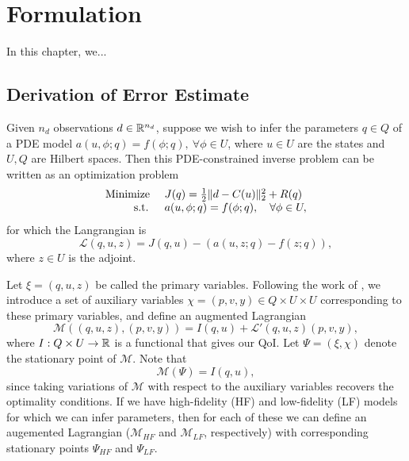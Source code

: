 \chapter{Formulation}

In this chapter, we...
\section{Derivation of Error Estimate}  \label{sec:deriv}
Given $n_d$ observations $d\in{\mathbb{R}}^{n_d}$, suppose we wish to infer the parameters $q\in Q$ of a PDE model $a(u,\phi;q)=f(\phi;q),\:\forall\phi\in U$, where $u\in U$ are the states and $U,Q$ are Hilbert spaces. Then this PDE-constrained inverse problem can be written as an optimization problem
\begin{equation}
\begin{array}{r@{}l}
\textrm{Minimize } & \quad J(q)=\frac{1}{2}\|d-C(u)\|_2^2 + R(q) \\ \textrm{s.t. }& \quad a(u,\phi;q)=f(\phi;q),\quad\forall\phi\in U,
\end{array}
\end{equation}
for which the Langrangian is
\begin{equation}
\mathcal{L}(q,u,z)= J(q,u)-(a(u,z;q)-f(z;q)),
\end{equation}
where $z\in U$ is the adjoint. 

Let $\xi=(q,u,z)$ be called the primary variables. Following the work of \cite{BecVex05}, we introduce a set of auxiliary variables $\chi=(p,v,y)\in Q\times U\times U$ corresponding to these primary variables, and define an augmented Lagrangian
\begin{equation}
\mathcal{M}((q,u,z),(p,v,y)) = I(q,u) + \mathcal{L}'(q,u,z)(p,v,y),
\end{equation}
where $I:Q\times U\to{\mathbb{R}}$ is a functional that gives our QoI. Let $\Psi = (\xi,\chi)$ denote the stationary point of $\mathcal{M}$. Note that
\begin{equation}
\mathcal{M}(\Psi)=I(q,u),
\label{eq:MeqI}
\end{equation} since taking variations of $\mathcal{M}$ with respect to the auxiliary variables recovers the optimality conditions. If we have high-fidelity (HF) and low-fidelity (LF) models for which we can infer parameters, then for each of these we can define an augemented Lagrangian ($\mathcal{M}_{HF}$ and $\mathcal{M}_{LF}$, respectively) with corresponding stationary points $\Psi_{HF}$ and $\Psi_{LF}$. 

